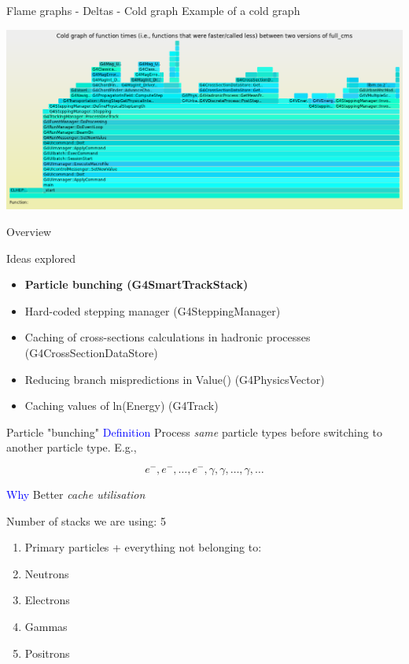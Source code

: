 \documentclass{beamer}
\begin{document}
\begin{frame}{Flame graphs - Deltas - Cold graph}
Example of a cold graph

\begin{center}
  \includegraphics[width=1.0\textwidth]{dec.png}
\end{center}
\end{frame}

\begin{frame}{Overview}

Ideas explored
\begin{itemize}
  \item {\bf Particle bunching (G4SmartTrackStack) }
  \item Hard-coded stepping manager (G4SteppingManager)
  \item Caching of cross-sections calculations in hadronic processes (G4CrossSectionDataStore)
  \item Reducing branch mispredictions in Value() (G4PhysicsVector)
  \item Caching values of ln(Energy) (G4Track)
\end{itemize}
\end{frame}

\begin{frame}{Particle "bunching"}
\textcolor{blue}{Definition}
Process \textit{same} particle types before switching to another particle type. E.g.,

\begin{equation*}
e^-, e^-, \ldots, e^-, \gamma, \gamma, \ldots, \gamma, \ldots
\end{equation*}

\textcolor{blue}{Why} Better \textit{cache utilisation}

\vspace{5 mm}

Number of stacks we are using: 5

\begin{enumerate}
\item Primary particles + everything not belonging to:
\item Neutrons
\item Electrons
\item Gammas
\item Positrons
\end{enumerate}
\end{frame}
\end{document}
